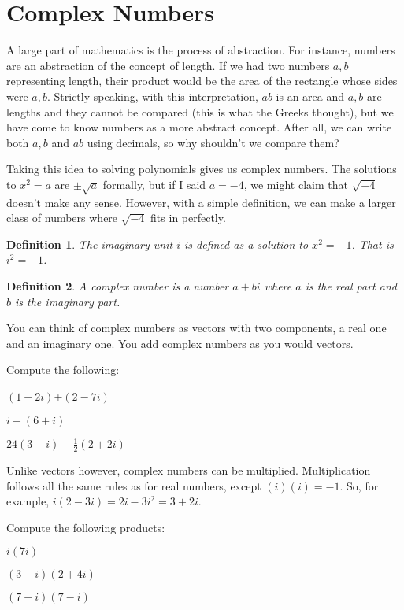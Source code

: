 \documentclass{article}
\newtheorem{definition}{Definition}
\begin{document}
\section*{Complex Numbers}
	A large part of mathematics is the process of abstraction.
	For instance, numbers are an abstraction of the concept of length.
	If we had two numbers $a,b$ representing length, their product would be 
	the area of the rectangle whose sides were $a,b$.  Strictly speaking, with
	this interpretation, $ab$ is an area and $a,b$ are lengths and they cannot be
	compared (this is what the Greeks thought), but we have come to know numbers as
	a more abstract concept.  After all, we can write both $a,b$ and $ab$ using decimals,
	so why shouldn't we compare them?

	Taking this idea to solving polynomials gives us complex numbers.  The solutions
	to $x^2=a$ are $\pm\sqrt{a}$ formally, but if I said $a=-4$, we might claim that $\sqrt{-4}$
	doesn't make any sense.  However, with a simple definition, we can make
	a larger class of numbers where $\sqrt{-4}$ fits in perfectly.

	\begin{definition}
		The imaginary unit $i$ is defined as a solution to $x^2=-1$.  That
		is $i^2=-1$.
	\end{definition}
	\begin{definition}
		A \emph{complex number} is a number $a+bi$ where $a$ is the \emph{real part}
		and $b$ is the \emph{imaginary part}.
	\end{definition}

	You can think of complex numbers as vectors with two components, a real one
	and an imaginary one.  You add complex numbers as you would vectors.

	Compute the following:
	\begin{Enum}
		\item $(1+2i)$+$(2-7i)$
		\item $i-(6+i)$
		\item $24(3+i)-\frac{1}{2}(2+2i)$
	\end{Enum}

	Unlike vectors however, complex numbers can be multiplied.  Multiplication
	follows all the same rules as for real numbers, except $(i)(i)=-1$.  So,
	for example, $i(2-3i)=2i-3i^2=3+2i$.

	Compute the following products:
	\begin{Enum}
		\item $i(7i)$
		\item $(3+i)(2+4i)$
		\item $(7+i)(7-i)$
	\end{Enum}
\end{document}
